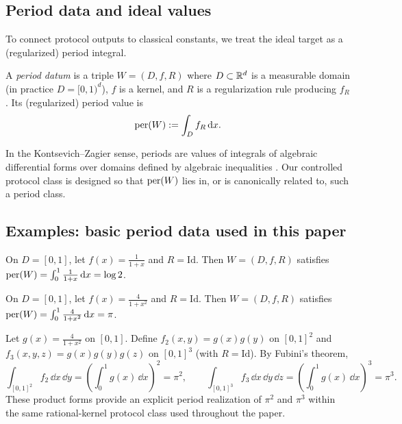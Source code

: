 \subsection{Period data and ideal values}
\label{sec:prelim_period_data}

To connect protocol outputs to classical constants, we treat the ideal target as a (regularized) period integral.

\begin{definition}
\label{def:period_datum}
A \emph{period datum} is a triple $W=(D,f,R)$ where $D\subset\mathbb{R}^d$ is a measurable domain (in practice $D=[0,1)^d$), $f$ is a kernel, and $R$ is a regularization rule producing $f_R$.
Its (regularized) period value is
\[
\mathrm{per}(W) := \int_D f_R\,\mathrm{d} x.
\]
\end{definition}

In the Kontsevich--Zagier sense, periods are values of integrals of algebraic differential forms over domains defined by algebraic inequalities \cite{KontsevichZagier2001}.
Our controlled protocol class is designed so that $\mathrm{per}(W)$ lies in, or is canonically related to, such a period class.

\subsection{Examples: basic period data used in this paper}
\label{sec:prelim_examples}

\begin{example}[$\log 2$]
On $D=[0,1]$, let $f(x)=\frac{1}{1+x}$ and $R=\mathrm{Id}$.
Then $W=(D,f,R)$ satisfies $\mathrm{per}(W)=\int_0^1 \frac{1}{1+x}\,\mathrm{d} x=\log 2$.
\end{example}

\begin{example}[$\pi$]
On $D=[0,1]$, let $f(x)=\frac{4}{1+x^2}$ and $R=\mathrm{Id}$.
Then $W=(D,f,R)$ satisfies $\mathrm{per}(W)=\int_0^1 \frac{4}{1+x^2}\,\mathrm{d} x=\pi$.
\end{example}

\begin{example}
\label{ex:pi_powers}
Let $g(x)=\frac{4}{1+x^2}$ on $[0,1]$.
Define $f_2(x,y)=g(x)g(y)$ on $[0,1]^2$ and $f_3(x,y,z)=g(x)g(y)g(z)$ on $[0,1]^3$ (with $R=\mathrm{Id}$).
By Fubini's theorem,
\[
\int_{[0,1]^2} f_2\,\dd x\,\dd y=\left(\int_0^1 g(x)\,\dd x\right)^2=\pi^2,
\qquad
\int_{[0,1]^3} f_3\,\dd x\,\dd y\,\dd z=\left(\int_0^1 g(x)\,\dd x\right)^3=\pi^3.
\]
These product forms provide an explicit period realization of $\pi^2$ and $\pi^3$ within the same rational-kernel protocol class used throughout the paper.
\end{example}

